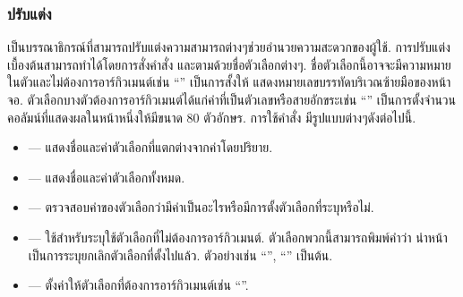 \begin{thwbr}
\subsubsection{ปรับแต่ง } 
 เป็นบรรณาธิกรณ์ที่สามารถปรับแต่งความสามารถต่างๆช่วยอำนวยความสะดวกของผู้ใช้. การปรับแต่งเบื้องต้นสามารถทำได้โดยการสั่งคำสั่ง  และตามด้วยชื่อตัวเลือกต่างๆ. ชื่อตัวเลือกนี้อาจจะมีความหมายในตัวและไม่ต้องการอาร์กิวเมนต์เช่น ``'' เป็นการสั้งให้  แสดงหมายเลขบรรทัดบริเวณซ้ายมือของหน้าจอ. ตัวเลือกบางตัวต้องการอาร์กิวเมนต์ได้แก่ค่าที่เป็นตัวเลขหรือสายอักขระเช่น ``'' เป็นการตั้งจำนวนคอลัมน์ที่แสดงผลในหน้าหนึ่งให้มีขนาด 80 ตัวอักษร. การใช้คำสั่ง  มีรูปแบบต่างๆดังต่อไปนี้.
\begin{itemize}
\item {} --- แสดงชื่อและค่าตัวเลือกที่แตกต่างจากค่าโดยปริยาย.
\item {} --- แสดงชื่อและค่าตัวเลือกทั้งหมด.
\item {} --- ตรวจสอบค่าของตัวเลือกว่ามีค่าเป็นอะไรหรือมีการตั้งตัวเลือกที่ระบุหรือไม่.
\item {} --- ใช้สำหรับระบุใช้ตัวเลือกที่ไม่ต้องการอาร์กิวเมนต์. ตัวเลือกพวกนี้สามารถพิมพ์คำว่า  นำหน้าเป็นการระบุยกเลิกตัวเลือกที่ตั้งไปแล้ว. ตัวอย่างเช่น ``'', ``'' เป็นต้น.
\item {} --- ตั้งค่าให้ตัวเลือกที่ต้องการอาร์กิวเมนต์เช่น ``''.
\end{itemize}


\end{thwbr}
